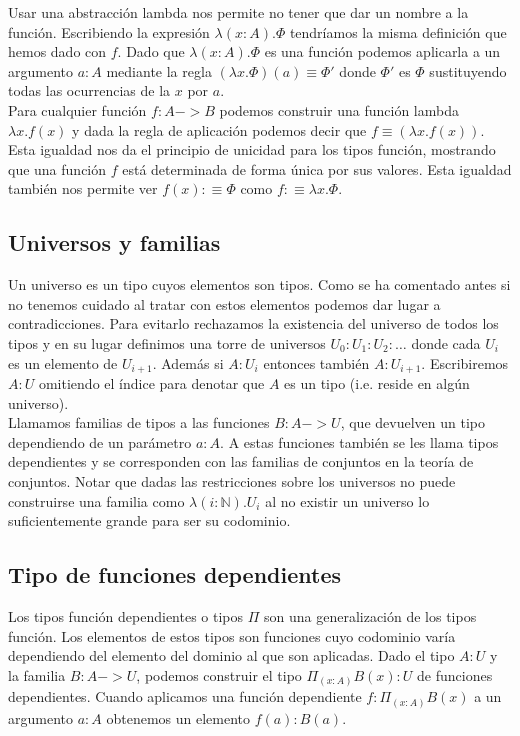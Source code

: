 Usar una abstracción lambda nos permite no tener que dar un nombre a la función. Escribiendo la expresión $\lambda(x:A).\Phi$ tendríamos la misma definición que hemos dado con $f$. Dado que $\lambda(x:A).\Phi$ es una función podemos aplicarla a un argumento $a:A$ mediante la regla $(\lambda x.\Phi)(a) \equiv \Phi'$ donde $\Phi'$ es $\Phi$ sustituyendo todas las ocurrencias de la $x$ por $a$.\\

Para cualquier función $f:A->B$ podemos construir una función lambda $\lambda x.f(x)$ y dada la regla de aplicación podemos decir que $f \equiv (\lambda x.f(x))$. Esta igualdad nos da el principio de unicidad para los tipos función, mostrando que una función $f$ está determinada de forma única por sus valores. Esta igualdad también nos permite ver $f(x) :\equiv \Phi$ como $f :\equiv \lambda x.\Phi$.\\


\subsection{Universos y familias}

Un universo es un tipo cuyos elementos son tipos. Como se ha comentado antes si no tenemos cuidado al tratar con estos elementos podemos dar lugar a contradicciones. Para evitarlo rechazamos la existencia del universo de todos los tipos y en su lugar definimos una torre de universos $U_0:U_1:U_2:\dotsc$ donde cada $U_i$ es un elemento de $U_{i+1}$. Además si $A:U_i$ entonces también $A:U_{i+1}$. Escribiremos $A:U$ omitiendo el índice para denotar que $A$ es un tipo (i.e. reside en algún universo).\\

Llamamos familias de tipos a las funciones $B : A -> U$, que devuelven un tipo dependiendo de un parámetro $a:A$. A estas funciones también se les llama tipos dependientes y se corresponden con las familias de conjuntos en la teoría de conjuntos. Notar que dadas las restricciones sobre los universos no puede construirse una familia como $\lambda(i:\mathbb{N}).U_i$ al no existir un universo lo suficientemente grande para ser su codominio.\\


\subsection{Tipo de funciones dependientes}

Los tipos función dependientes o tipos $\Pi$ son una generalización de los tipos función. Los elementos de estos tipos son funciones cuyo codominio varía dependiendo del elemento del dominio al que son aplicadas. Dado el tipo $A:U$ y la familia $B : A -> U$, podemos construir el tipo $\Pi_{(x:A)} B(x):U$ de funciones dependientes. Cuando aplicamos una función dependiente $f:\Pi_{(x:A)} B(x)$ a un argumento $a:A$ obtenemos un elemento $f(a):B(a)$.\\

